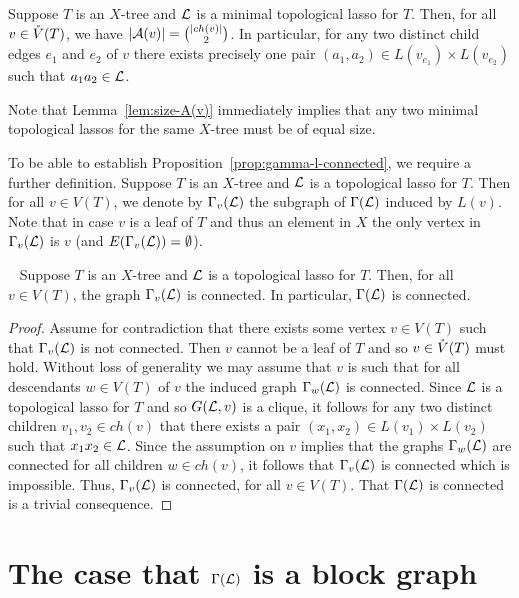 \begin{lem}\label{lem:size-A(v)}
  Suppose $T$ is an $X$-tree and ${\mathcal L}$ is a minimal topological lasso for
  $T$. Then, for all $v\in \mathring{V}(T)$, we have $|{\mathcal A}(v)|={|ch(v)|\choose 2}$. In
  particular, for any two distinct child edges $e_1$ and $e_2$ of $v$ there
  exists precisely one pair $(a_1,a_2)\in L(v_{e_1})\times L(v_{e_2})$ such
  that $a_1a_2\in{\mathcal L}$.
\end{lem}

Note that Lemma~\ref{lem:size-A(v)} immediately implies that any two minimal
topological lassos for the same $X$-tree must be of equal size.

To be able to establish Proposition~\ref{prop:gamma-l-connected}, we require a
further definition.  Suppose $T$ is an $X$-tree and ${\mathcal L}$ is a topological
lasso for $T$. Then for all $v\in V(T)$, we denote by $\Gamma_v({\mathcal L})$ the
subgraph of $\Gamma({\mathcal L})$ induced by $L(v)$. Note that in case $v$ is a leaf
of $T$ and thus an element in $X$ the only vertex in $\Gamma_v({\mathcal L})$ is $v$
(and $E(\Gamma_v({\mathcal L}))=\emptyset$).

\begin{pro}~\label{prop:gamma-l-connected} Suppose $T$ is an $X$-tree and
  ${\mathcal L}$ is a topological lasso for $T$.  Then, for all $v\in V(T)$, the graph
  $\Gamma_v({\mathcal L})$ is connected.  In particular, $\Gamma({\mathcal L})$ is connected.
\end{pro}
\begin{proof}
  Assume for contradiction that there exists some vertex $v\in V(T)$ such that
  $\Gamma_v({\mathcal L})$ is not connected. Then $v$ cannot be a leaf of $T$ and so
  $v\in \mathring{V}(T)$ must hold. Without loss of generality we may assume that $v$
  is such that for all descendants $w\in V(T)$ of $v$ the induced graph
  $\Gamma_w({\mathcal L})$ is connected. Since ${\mathcal L}$ is a topological lasso for $T$ and
  so $G({\mathcal L},v)$ is a clique, it follows for any two distinct children
  $v_1,v_2\in ch(v)$ that there exists a pair $(x_1,x_2)\in L(v_1)\times
  L(v_2)$ such that $x_1x_2\in {\mathcal L}$.  Since the assumption on $v$ implies that
  the graphs $\Gamma_{w}({\mathcal L})$ are connected for all children $w\in ch(v)$, it
  follows that $\Gamma_v({\mathcal L})$ is connected which is impossible.  Thus,
  $\Gamma_v({\mathcal L})$ is connected, for all $v\in V(T)$.  That $\Gamma({\mathcal L})$ is
  connected is a trivial consequence.  \qquad
\end{proof}

\section{The case that $\Gamma({\mathcal L})$ is a block graph}
\label{sec:blockgraph}

